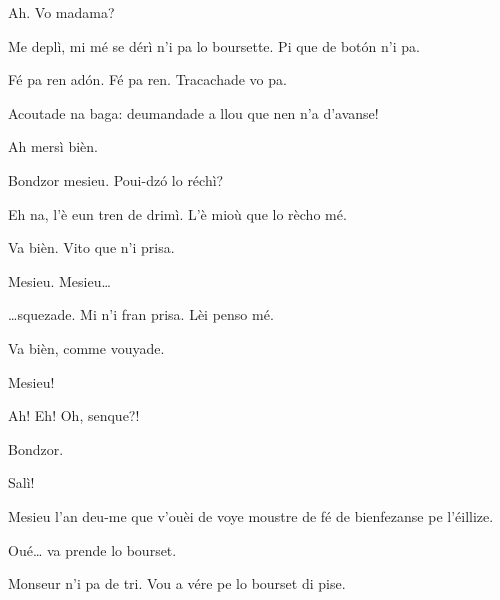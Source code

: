 \begin{drama}
\Priespeaks{} Ah.  Vo madama?

\Gerominespeaks Me deplì, mi mé se dérì n'i pa lo boursette. Pi que de bot\'on n'i pa.

\Priespeaks Fé pa ren ad\'on. Fé pa ren. Tracachade vo pa.

\Casimirspeaks Acoutade na baga:  deumandade a llou que nen n'a d’avanse!

\Priespeaks Ah mersì bièn.


\Priespeaks{} Bondzor mesieu. Poui-dz\'o lo réchì?

\Eunfeurmispeaks Eh na, l'è eun tren de drimì. L'è mioù que lo rècho mé.

\Priespeaks Va bièn. Vito que n'i prisa.


\Eunfeurmispeaks{} Mesieu. Mesieu\ldots


\Priespeaks \ldots squezade. Mi n'i fran prisa. Lèi penso mé.

\Eunfeurmispeaks Va bièn, comme vouyade.


\Priespeaks{} Mesieu!


\PersEmpourtantaspeaks Ah! Eh! Oh, senque?!

\Priespeaks Bondzor.

\PersEmpourtantaspeaks Salì!

\Priespeaks Mesieu l’an deu-me que v'ouèi de voye moustre de fé de bienfezanse pe l’éillize.

\PersEmpourtantaspeaks Oué\ldots {} va prende lo bourset.


\Eunfeurmispeaks Monseur n'i pa de tri. Vou a vére pe lo bourset di pise.



\end{drama}
